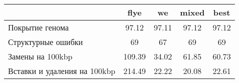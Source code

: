 \begin{minipage}{0.91\textwidth}
\begin{adjustbox}{center}
\begin{tabular}{|l||c|c|c|c|}
\hline
 & flye & we & mixed & best \\
\hline
\hline
Покрытие генома & \cellcolor[RGB]{241, 241, 253} 97.12 & \cellcolor[RGB]{251, 223, 223} 97.11 & \cellcolor[RGB]{254, 250, 250} 97.12 & \cellcolor[RGB]{250, 250, 254} 97.12 \\
\hline
Структурные ошибки & \cellcolor[RGB]{255, 255, 255} 69 & \cellcolor[RGB]{218, 218, 251} 67 & \cellcolor[RGB]{255, 255, 255} 69 & \cellcolor[RGB]{255, 255, 255} 69 \\
\hline
Замены на 100kbp & \cellcolor[RGB]{235, 71, 71} 109.39 & \cellcolor[RGB]{218, 218, 251} 34.02 & \cellcolor[RGB]{255, 255, 255} 61.85 & \cellcolor[RGB]{255, 255, 255} 60.73 \\
\hline
Вставки и удаления на 100kbp & \cellcolor[RGB]{235, 71, 71} 214.49 & \cellcolor[RGB]{250, 250, 254} 22.22 & \cellcolor[RGB]{218, 218, 251} 20.08 & \cellcolor[RGB]{254, 250, 250} 22.61 \\
\hline
\end{tabular}
\end{adjustbox}
\end{minipage}
